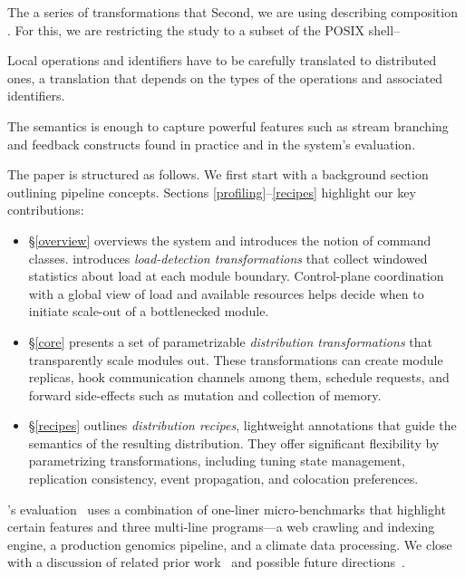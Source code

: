 \documentclass[sigplan,10pt,review,anonymous]{acmart}
\newcommand{\eat}[1]{}
\begin{document}
The a series of transformations that 
Second, we are using describing composition . For this, we are restricting the study to a subset of the POSIX shell--

Local operations and identifiers have to be carefully translated to distributed ones, a translation that depends on the types of the operations and associated identifiers.

The semantics is enough to capture powerful features such as stream branching and feedback constructs found in practice and in the system's evaluation.


The paper is structured as follows.
We first start with a background section outlining pipeline concepts.
Sections \ref{profiling}--\ref{recipes} highlight our key contributions:
\begin{itemize}

  \item
  \S\ref{overview} overviews the system and introduces the notion of command classes.
	introduces \emph{load-detection transformations} that collect windowed statistics about load at each module boundary.
  Control-plane coordination with a global view of load and available resources helps decide when to initiate scale-out of a bottlenecked module.

  \item
  \S\ref{core} presents a set of parametrizable \emph{distribution transformations} that transparently scale modules out.
  These transformations can create module replicas, hook communication channels among them, schedule requests, and forward side-effects such as mutation and collection of memory.

  \item
  \S\ref{recipes} outlines \emph{distribution recipes}, lightweight annotations that guide the semantics of the resulting distribution.
  They offer significant flexibility by\eat{ generating configurations that} parametrizing transformations, including tuning state management, replication consistency, event propagation, and colocation preferences.
\end{itemize}

\noindent
\sys's evaluation~ uses a combination of one-liner micro-benchmarks that highlight certain features and three multi-line programs---a web crawling and indexing engine, a production genomics pipeline, and a climate data processing.
We close with a discussion of related prior work~ and possible future directions~.
\end{document}
